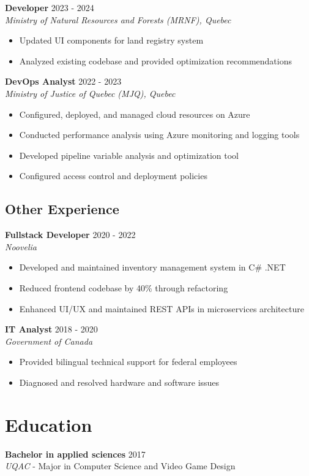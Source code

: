 ﻿\documentclass[11pt,letterpaper]{article}
\begin{document}
\newpage

\textbf{Developer} \hfill 2023 - 2024\\
\textit{Ministry of Natural Resources and Forests (MRNF), Quebec}
\begin{itemize}
\item Updated UI components for land registry system
\item Analyzed existing codebase and provided optimization recommendations
\end{itemize}

\textbf{DevOps Analyst} \hfill 2022 - 2023\\
\textit{Ministry of Justice of Quebec (MJQ), Quebec}
\begin{itemize}
\item Configured, deployed, and managed cloud resources on Azure
\item Conducted performance analysis using Azure monitoring and logging tools
\item Developed pipeline variable analysis and optimization tool
\item Configured access control and deployment policies
\end{itemize}

\subsection*{Other Experience}

\textbf{Fullstack Developer} \hfill 2020 - 2022\\
\textit{Noovelia}
\begin{itemize}
\item Developed and maintained inventory management system  in C\# .NET
\item Reduced frontend codebase by 40\% through refactoring
\item Enhanced UI/UX and maintained REST APIs in microservices architecture
\end{itemize}

\textbf{IT Analyst} \hfill 2018 - 2020\\
\textit{Government of Canada}
\begin{itemize}
\item Provided bilingual technical support for federal employees
\item Diagnosed and resolved hardware and software issues
\end{itemize}

\section*{Education}
\textbf{Bachelor in applied sciences} \hfill 2017\\
\textit{UQAC} - Major in Computer Science and Video Game Design
\end{document}
